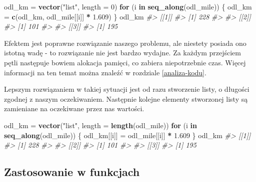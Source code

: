 \documentclass[paper=6in:9in,pagesize=pdftex,headinclude=on,footinclude=on,10pt]{scrbook}
\newenvironment{Shaded}{\begin{snugshade}}{\end{snugshade}}
\newcommand{\CommentTok}[1]{\textcolor[rgb]{0.56,0.35,0.01}{\textit{#1}}}
\newcommand{\ControlFlowTok}[1]{\textcolor[rgb]{0.13,0.29,0.53}{\textbf{#1}}}
\newcommand{\DataTypeTok}[1]{\textcolor[rgb]{0.13,0.29,0.53}{#1}}
\newcommand{\DecValTok}[1]{\textcolor[rgb]{0.00,0.00,0.81}{#1}}
\newcommand{\FloatTok}[1]{\textcolor[rgb]{0.00,0.00,0.81}{#1}}
\newcommand{\KeywordTok}[1]{\textcolor[rgb]{0.13,0.29,0.53}{\textbf{#1}}}
\newcommand{\NormalTok}[1]{#1}
\newcommand{\OperatorTok}[1]{\textcolor[rgb]{0.81,0.36,0.00}{\textbf{#1}}}
\newcommand{\StringTok}[1]{\textcolor[rgb]{0.31,0.60,0.02}{#1}}
\begin{document}
\begin{Shaded}
\begin{Highlighting}[]
\NormalTok{odl_km =}\StringTok{ }\KeywordTok{vector}\NormalTok{(}\StringTok{"list"}\NormalTok{, }\DataTypeTok{length =} \DecValTok{0}\NormalTok{)}
\ControlFlowTok{for}\NormalTok{ (i }\ControlFlowTok{in} \KeywordTok{seq_along}\NormalTok{(odl_mile)) \{}
\NormalTok{  odl_km =}\StringTok{ }\KeywordTok{c}\NormalTok{(odl_km, odl_mile[[i]] }\OperatorTok{*}\StringTok{ }\FloatTok{1.609}\NormalTok{)}
\NormalTok{\}}
\NormalTok{odl_km}
\CommentTok{#> [[1]]}
\CommentTok{#> [1] 228}
\CommentTok{#> }
\CommentTok{#> [[2]]}
\CommentTok{#> [1] 101}
\CommentTok{#> }
\CommentTok{#> [[3]]}
\CommentTok{#> [1] 195}
\end{Highlighting}
\end{Shaded}

Efektem jest poprawne rozwiązanie naszego problemu, ale niestety posiada ono istotną wadę - to rozwiązanie nie jest bardzo wydajne.
Za każdym przejściem pętli następuje bowiem alokacja pamięci, co zabiera niepotrzebnie czas.
Więcej informacji na ten temat można znaleźć w rozdziale \ref{analiza-kodu}.

Lepszym rozwiązaniem w takiej sytuacji jest od razu stworzenie listy, o długości zgodnej z naszym oczekiwaniem.
Następnie kolejne elementy stworzonej listy są zamieniane na oczekiwane przez nas wartości.

\begin{Shaded}
\begin{Highlighting}[]
\NormalTok{odl_km =}\StringTok{ }\KeywordTok{vector}\NormalTok{(}\StringTok{"list"}\NormalTok{, }\DataTypeTok{length =} \KeywordTok{length}\NormalTok{(odl_mile))}
\ControlFlowTok{for}\NormalTok{ (i }\ControlFlowTok{in} \KeywordTok{seq_along}\NormalTok{(odl_mile)) \{}
\NormalTok{  odl_km[[i]] =}\StringTok{ }\NormalTok{odl_mile[[i]] }\OperatorTok{*}\StringTok{ }\FloatTok{1.609}
\NormalTok{\}}
\NormalTok{odl_km}
\CommentTok{#> [[1]]}
\CommentTok{#> [1] 228}
\CommentTok{#> }
\CommentTok{#> [[2]]}
\CommentTok{#> [1] 101}
\CommentTok{#> }
\CommentTok{#> [[3]]}
\CommentTok{#> [1] 195}
\end{Highlighting}
\end{Shaded}

\hypertarget{zastosowanie-w-funkcjach}{%
\subsection{Zastosowanie w funkcjach}\label{zastosowanie-w-funkcjach}}
\end{document}
